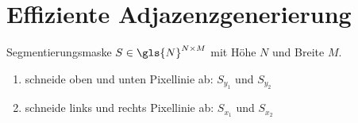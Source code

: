 \section{Effiziente Adjazenzgenerierung}

Segmentierungsmaske $S \in \gls{N}^{N \times M}$ mit Höhe $N$ und Breite $M$.

\begin{enumerate}
  \item schneide oben und unten Pixellinie ab: $S_{y_1}$ und $S_{y_2}$
  \item schneide links und rechts Pixellinie ab: $S_{x_1}$ und $S_{x_2}$
\end{enumerate}


